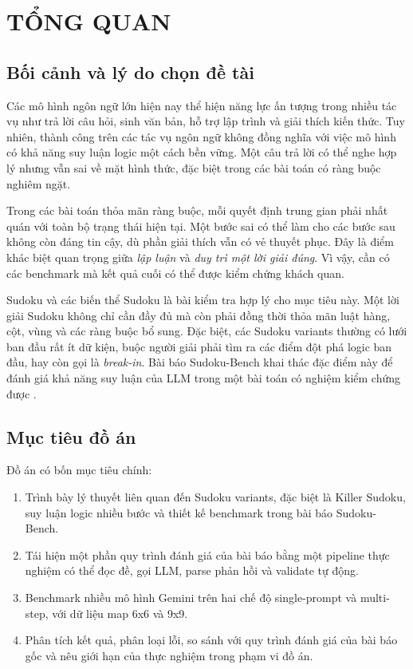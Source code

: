 \documentclass[12pt,a4paper,oneside]{report}
\newlength{\manualparindent}
\newcommand{\manualindent}{\hspace*{\manualparindent}}
\begin{document}
\chapter{TỔNG QUAN}

\section{Bối cảnh và lý do chọn đề tài}

\manualindent%
Các mô hình ngôn ngữ lớn hiện nay thể hiện năng lực ấn tượng trong nhiều tác vụ như trả lời câu hỏi, sinh văn bản, hỗ trợ lập trình và giải thích kiến thức. Tuy nhiên, thành công trên các tác vụ ngôn ngữ không đồng nghĩa với việc mô hình có khả năng suy luận logic một cách bền vững. Một câu trả lời có thể nghe hợp lý nhưng vẫn sai về mặt hình thức, đặc biệt trong các bài toán có ràng buộc nghiêm ngặt.

\manualindent%
Trong các bài toán thỏa mãn ràng buộc, mỗi quyết định trung gian phải nhất quán với toàn bộ trạng thái hiện tại. Một bước sai có thể làm cho các bước sau không còn đáng tin cậy, dù phần giải thích vẫn có vẻ thuyết phục. Đây là điểm khác biệt quan trọng giữa \textit{lập luận} và \textit{duy trì một lời giải đúng}. Vì vậy, cần có các benchmark mà kết quả cuối có thể được kiểm chứng khách quan.

\manualindent%
Sudoku và các biến thể Sudoku là bài kiểm tra hợp lý cho mục tiêu này. Một lời giải Sudoku không chỉ cần đầy đủ mà còn phải đồng thời thỏa mãn luật hàng, cột, vùng và các ràng buộc bổ sung. Đặc biệt, các Sudoku variants thường có lưới ban đầu rất ít dữ kiện, buộc người giải phải tìm ra các điểm đột phá logic ban đầu, hay còn gọi là \textit{break-in}. Bài báo Sudoku-Bench khai thác đặc điểm này để đánh giá khả năng suy luận của LLM trong một bài toán có nghiệm kiểm chứng được \cite{sudoku-bench}.

\section{Mục tiêu đồ án}

Đồ án có bốn mục tiêu chính:

\begin{enumerate}[label=\arabic*.]
  \item Trình bày lý thuyết liên quan đến Sudoku variants, đặc biệt là Killer Sudoku, suy luận logic nhiều bước và thiết kế benchmark trong bài báo Sudoku-Bench.
  \item Tái hiện một phần quy trình đánh giá của bài báo bằng một pipeline thực nghiệm có thể đọc đề, gọi LLM, parse phản hồi và validate tự động.
  \item Benchmark nhiều mô hình Gemini trên hai chế độ single-prompt và multi-step, với dữ liệu map 6x6 và 9x9.
  \item Phân tích kết quả, phân loại lỗi, so sánh với quy trình đánh giá của bài báo gốc và nêu giới hạn của thực nghiệm trong phạm vi đồ án.
\end{enumerate}
\end{document}
